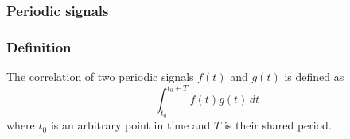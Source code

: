 \documentclass{beamer}
\begin{document}
\begin{frame}
  \frametitle{Periodic signals}

\end{frame}

\begin{frame}
  \frametitle{Definition}
  
  The correlation of two periodic signals $f(t)$ and $g(t)$ is defined as \[\int_{t_0}^{t_0 + T} f(t) g(t) \,dt\] where $t_0$ is an arbitrary point in time and $T$ is their shared period.
\end{frame}
\end{document}
